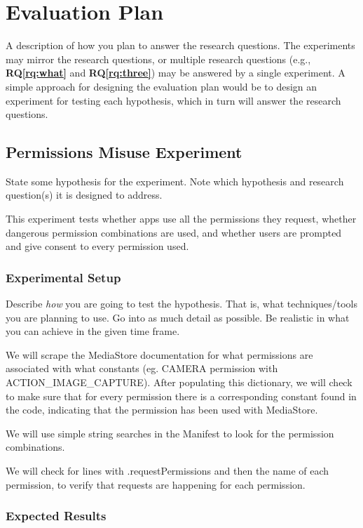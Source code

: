 \documentclass[10pt,twocolumn,pdftex]{article}
\newcommand{\rqref}[1]{\textbf{RQ\ref{#1}}}
\begin{document}
\section{Evaluation Plan}

A description of how you plan to answer the research questions. The
experiments  may mirror the research questions, or multiple research
questions (e.g., \rqref{rq:what} and \rqref{rq:three}) may be answered
by a single experiment. A simple approach for designing the evaluation
plan would be to design an experiment for testing each hypothesis, which
in turn will answer the research questions.

\subsection{Permissions Misuse Experiment}


    State some hypothesis for the experiment. Note which hypothesis and
    research question(s) it is designed to address.

    This experiment tests whether apps use all the permissions they request, whether dangerous permission combinations are used, and whether users are prompted and give consent to every permission used.

    \subsubsection{Experimental Setup}
    Describe {\em how} you are going to test the hypothesis. That is, what
    techniques/tools you are planning to use. Go into as much detail as
    possible. Be realistic in what you can achieve in the given time frame.

    We will scrape the MediaStore documentation for what permissions are associated with what constants (eg. CAMERA permission with ACTION_IMAGE_CAPTURE). After populating this dictionary, we will check to make sure that for every permission there is a corresponding constant found in the code, indicating that the permission has been used with MediaStore.

    We will use simple string searches in the Manifest to look for the permission combinations. 

    We will check for lines with .requestPermissions and then the name of each permission, to verify that requests are happening for each permission.


    \subsubsection{Expected Results}
\end{document}
